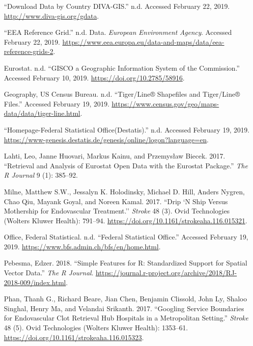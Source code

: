 \documentclass[]{article}
\begin{document}
\leavevmode\hypertarget{ref-diva-gis}{}%
``Download Data by Country DIVA-GIS.'' n.d. Accessed February 22, 2019.
\url{http://www.diva-gis.org/gdata}.

\leavevmode\hypertarget{ref-eea-ref-grid}{}%
``EEA Reference Grid.'' n.d. Data. \emph{European Environment Agency}.
Accessed February 22, 2019.
\url{https://www.eea.europa.eu/data-and-maps/data/eea-reference-grids-2}.

\leavevmode\hypertarget{ref-eurostat}{}%
Eurostat. n.d. ``GISCO a Geographic Information System of the
Commission.'' Accessed February 10, 2019.
\url{https://doi.org/10.2785/58916}.

\leavevmode\hypertarget{ref-us_census_tiger_line}{}%
Geography, US Census Bureau. n.d. ``Tiger/Line® Shapefiles and
Tiger/Line® Files.'' Accessed February 19, 2019.
\url{https://www.census.gov/geo/maps-data/data/tiger-line.html}.

\leavevmode\hypertarget{ref-destatis}{}%
``Homepage-Federal Statistical Office(Destatis).'' n.d. Accessed
February 19, 2019.
\url{https://www-genesis.destatis.de/genesis/online/logon?language=en}.

\leavevmode\hypertarget{ref-Lahti2017}{}%
Lahti, Leo, Janne Huovari, Markus Kainu, and Przemysław Biecek. 2017.
``Retrieval and Analysis of Eurostat Open Data with the Eurostat
Package.'' \emph{The R Journal} 9 (1): 385--92.

\leavevmode\hypertarget{ref-Milne_2017}{}%
Milne, Matthew S.W., Jessalyn K. Holodinsky, Michael D. Hill, Anders
Nygren, Chao Qiu, Mayank Goyal, and Noreen Kamal. 2017. ``Drip `N Ship
Versus Mothership for Endovascular Treatment.'' \emph{Stroke} 48 (3).
Ovid Technologies (Wolters Kluwer Health): 791--94.
\url{https://doi.org/10.1161/strokeaha.116.015321}.

\leavevmode\hypertarget{ref-swiss-bfs}{}%
Office, Federal Statistical. n.d. ``Federal Statistical Office.''
Accessed February 19, 2019.
\url{https://www.bfs.admin.ch/bfs/en/home.html}.

\leavevmode\hypertarget{ref-Pebesma_2018}{}%
Pebesma, Edzer. 2018. ``Simple Features for R: Standardized Support for
Spatial Vector Data.'' \emph{The R Journal}.
\url{https://journal.r-project.org/archive/2018/RJ-2018-009/index.html}.

\leavevmode\hypertarget{ref-Phan_2017}{}%
Phan, Thanh G., Richard Beare, Jian Chen, Benjamin Clissold, John Ly,
Shaloo Singhal, Henry Ma, and Velandai Srikanth. 2017. ``Googling
Service Boundaries for Endovascular Clot Retrieval Hub Hospitals in a
Metropolitan Setting.'' \emph{Stroke} 48 (5). Ovid Technologies (Wolters
Kluwer Health): 1353--61.
\url{https://doi.org/10.1161/strokeaha.116.015323}.
\end{document}
